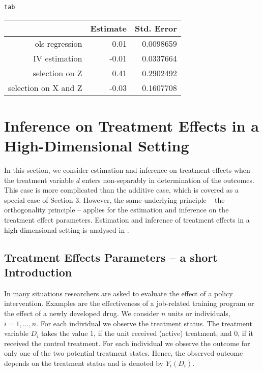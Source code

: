 \documentclass{amsart}\usepackage[]{graphicx}\usepackage[]{color}
\makeatletter
\newcommand{\hlstd}[1]{\textcolor[rgb]{0.345,0.345,0.345}{#1}}%
\newenvironment{kframe}{%
 \def\at@end@of@kframe{}%
 \ifinner\ifhmode%
  \def\at@end@of@kframe{\end{minipage}}%
  \begin{minipage}{\columnwidth}%
 \fi\fi%
 \def\FrameCommand##1{\hskip\@totalleftmargin \hskip-\fboxsep
 \colorbox{shadecolor}{##1}\hskip-\fboxsep
     \hskip-\linewidth \hskip-\@totalleftmargin \hskip\columnwidth}%
 \MakeFramed {\advance\hsize-\width
   \@totalleftmargin\z@ \linewidth\hsize
   \@setminipage}}%
 {\par\unskip\endMakeFramed%
 \at@end@of@kframe}
\makeatother
\begin{document}
\begin{kframe}
\begin{alltt}
\hlstd{tab}
\end{alltt}
\end{kframe}%
\begin{table}[ht]
\centering
\begin{tabular}{rrr}
  \hline
 & Estimate & Std. Error \\ 
  \hline
ols regression & 0.01 & 0.0098659 \\ 
  IV estimation  & -0.01 & 0.0337664 \\ 
  selection on Z & 0.41 & 0.2902492 \\ 
  selection on X and Z & -0.03 & 0.1607708 \\ 
   \hline
\end{tabular}
\end{table}



\section{Inference on Treatment Effects in a High-Dimensional Setting}

In this section, we consider estimation and inference on treatment effects when the treatment variable $d$ enters non-separably in determination of the outcomes. This case is more complicated than the additive case, which is covered as a special case of Section 3. However, the same underlying principle -- the orthogonality principle -- applies for the estimation and inference on the treatment effect parameters. Estimation and inference of treatment effects in a high-dimensional setting is analysed in \citet{BCFH:Policy}.


\subsection{Treatment Effects Parameters -- a short Introduction}

In many situations researchers are asked to evaluate the effect of a policy intervention. Examples are the effectiveness of a job-related training program or the effect of a newly developed drug. We consider $n$ units or individuals, $i=1,\ldots,n$. For each individual we observe the treatment status. The treatment variable $D_i$ takes the value $1$, if the unit received (active) treatment, and $0$, if it received the control treatment. For each individual we observe the outcome for only one of the two potential treatment states. Hence, the observed outcome depends on the treatment status and is denoted by $Y_i(D_i)$. 
\end{document}
